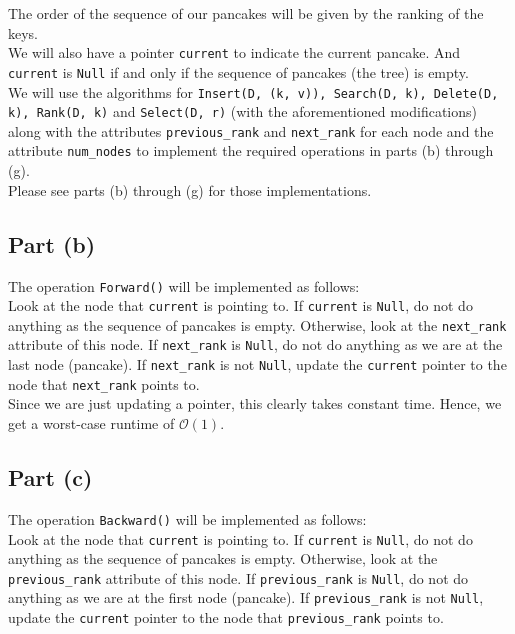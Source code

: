 \documentclass[12pt]{article}
\begin{document}
The order of the sequence of our pancakes will be given by the ranking of the keys. \\

We will also have a pointer \verb|current| to indicate the current pancake. And \verb|current| is \verb|Null| if and only if the sequence of pancakes (the tree) is empty. \\  

We will use the algorithms for \verb|Insert(D, (k, v)), Search(D, k), Delete(D, k), Rank(D, k)| and \verb|Select(D, r)| (with the aforementioned modifications) along with the attributes \verb|previous_rank| and \verb|next_rank| for each node and the attribute \verb|num_nodes| to implement the required operations in parts (b) through (g). \\

Please see parts (b) through (g) for those implementations.

\newpage

\subsection*{Part (b)}

The operation \verb|Forward()| will be implemented as follows: \\

Look at the node that \verb|current| is pointing to. If \verb|current| is \verb|Null|, do not do anything as the sequence of pancakes is empty. Otherwise, look at the \verb|next_rank| attribute of this node. If \verb|next_rank| is \verb|Null|, do not do anything as we are at the last node (pancake). If \verb|next_rank| is not \verb|Null|, update the \verb|current| pointer to the node that \verb|next_rank| points to. \\

Since we are just updating a pointer, this clearly takes constant time. Hence, we get a worst-case runtime of $\mathcal{O}(1)$.

\subsection*{Part (c)}

The operation \verb|Backward()| will be implemented as follows: \\

Look at the node that \verb|current| is pointing to. If \verb|current| is \verb|Null|, do not do anything as the sequence of pancakes is empty. Otherwise, look at the \verb|previous_rank| attribute of this node. If \verb|previous_rank| is \verb|Null|, do not do anything as we are at the first node (pancake). If \verb|previous_rank| is not \verb|Null|, update the \verb|current| pointer to the node that \verb|previous_rank| points to. \\
\end{document}
